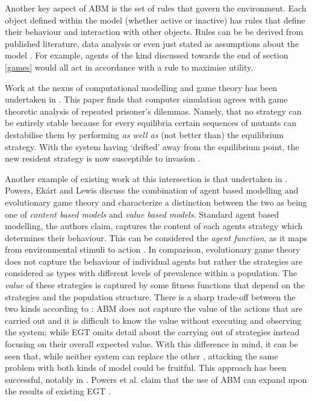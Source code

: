 \documentclass[11pt]{article}
\newcommand*{\np}{\par\noindent\newline}
\begin{document}
\np Another key aspect of ABM is the set of rules that govern the environment. Each object defined within the model
(whether active or inactive) has rules that define their behaviour and interaction with other objects. Rules can be be
derived from published literature, data analysis or even just stated as assumptions about the model
\citep{heppenstall_introduction_2012}. For example, agents of the kind discussed towards the end of section \ref{games}
would all act in accordance with a rule to maximise utility. 

\np Work at the nexus of computational modelling and game theory has been undertaken in \citep{garcia_no_2018}. This
paper finds that computer simulation agrees with game theoretic analysis of repeated prisoner's dilemmas. Namely, that
no strategy can be entirely stable because for every equilibria certain sequences of mutants can destabilise them by
performing \textit{as well as} (not better than) the equilibrium strategy. With the system having `drifted' away from
the equilibrium point, the new resident strategy is now susceptible to invasion \citep{garcia_no_2018}.

\np Another example of existing work at this intersection is that undertaken in \citep{powers_modelling_2018}. Powers,
Ekárt and Lewis discuss the combination of agent based modelling and evolutionary game theory and characterize a
distinction between the two as being one of \textit{content based models} and \textit{value based models}. Standard
agent based modelling, the authors claim, captures the content of each agents strategy which determines their behaviour.
This can be considered the \textit{agent function}, as it maps from environmental stimuli to action \citep[~p.
69]{powers_modelling_2018}. In comparison, evolutionary game theory does not capture the behaviour of individual agents
but rather the strategies are considered as types with different levels of prevalence within a population. The
\textit{value} of these strategies is captured by some fitness functions that depend on the strategies and the
population structure. There is a sharp trade-off between the two kinds according to \citep{powers_modelling_2018}: ABM
does not capture the value of the actions that are carried out and it is difficult to know the value without executing
and observing the system; while EGT omits detail about the carrying out of strategies instead focusing on their overall
expected value. With this difference in mind, it can be seen that, while neither system can replace the other
\citep{powers_modelling_2018}, attacking the same problem with both kinds of model could be fruitful. This approach has
been successful, notably in \citep{axelrod_effective_1980}. Powers et al. claim that the use of ABM can expand upon the results of existing EGT \citep[~p.71]{powers_modelling_2018}.
\end{document}
